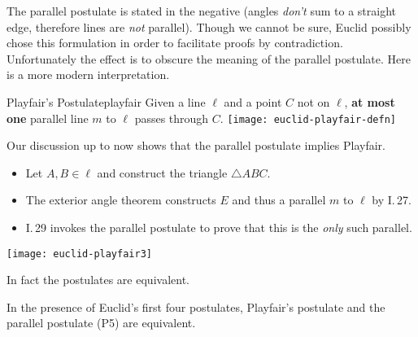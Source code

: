 The parallel postulate is stated in the negative (angles \emph{don't} sum to a straight edge, therefore lines are \emph{not} parallel). Though we cannot be sure, Euclid possibly chose this formulation in order to facilitate proofs by contradiction. Unfortunately the effect is to obscure the meaning of the parallel postulate. Here is a more modern interpretation.

\begin{axiom}[lower separated=false, sidebyside, sidebyside align=top seam, sidebyside gap=0pt, righthand width=0.37\linewidth]{Playfair's Postulate}{playfair}
	Given a line $\ell$ and a point $C$ not on $\ell$, \textbf{at most one} parallel line $m$ to $\ell$ passes through $C$.
	\tcblower
	\flushright
	\texttt{[image: euclid-playfair-defn]}
\end{axiom}


\begin{minipage}[t]{0.62\linewidth}\vspace{0pt}
	Our discussion up to now shows that the parallel postulate implies Playfair.
	\begin{itemize}\itemsep0pt
	  \item Let $A,B\in\ell$ and construct the triangle $\triangle ABC$.
	  \item The exterior angle theorem constructs $E$ and thus a parallel $m$ to $\ell$ by I.\,27.
	  \item I.\,29 invokes the parallel postulate to prove that this is the \emph{only} such parallel.
	\end{itemize}
\end{minipage}
\hfill
\begin{minipage}[t]{0.37\linewidth}\vspace{0pt}
	\flushright
	\texttt{[image: euclid-playfair3]}
\end{minipage}\bigbreak

In fact the postulates are equivalent.

\begin{thm}{}{}
	In the presence of Euclid's first four postulates, Playfair's postulate and the parallel postulate (P5) are equivalent.
\end{thm}

